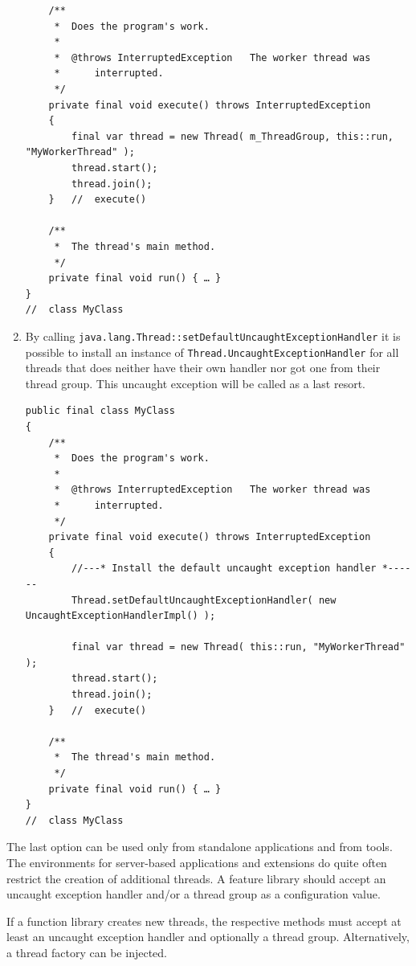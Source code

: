 \documentclass[11pt,a4paper, titlepage, parskip=half, headsepline, footsepline, cleardoublepage=current, headheight=1cm]{scrbook}
\begin{document}
\begin{enumerate}
{\begin{lstlisting}
    /**
     *  Does the program's work.
     *
     *  @throws InterruptedException   The worker thread was
     *      interrupted.
     */
    private final void execute() throws InterruptedException
    {
        final var thread = new Thread( m_ThreadGroup, this::run, "MyWorkerThread" );
        thread.start();
        thread.join();
    }   //  execute()
     
    /**
     *  The thread's main method.
     */
    private final void run() { … }
}
//  class MyClass
\end{lstlisting}
}
\item{By calling \lstinline|java.lang.Thread::setDefaultUncaughtExceptionHandler|\autocite{ORACLE_DOC_THREAD:setDefaultUncaughtExceptionHandler} it is possible to install an instance of \lstinline|Thread.UncaughtExceptionHandler| for all threads that does neither have their own handler nor got one from their thread group. This uncaught exception will be called as a last resort.
\begin{lstlisting}
public final class MyClass
{
    /**
     *  Does the program's work.
     *
     *  @throws InterruptedException   The worker thread was
     *      interrupted.
     */
    private final void execute() throws InterruptedException
    {
        //---* Install the default uncaught exception handler *------
        Thread.setDefaultUncaughtExceptionHandler( new UncaughtExceptionHandlerImpl() );
        
        final var thread = new Thread( this::run, "MyWorkerThread" );
        thread.start();
        thread.join();
    }   //  execute()
     
    /**
     *  The thread's main method.
     */
    private final void run() { … }
}
//  class MyClass
\end{lstlisting}
}
\end{enumerate}

The last option can be used only from standalone applications and from tools. The environments for server-based applications and extensions do quite often restrict the creation of additional threads. A feature library should accept an uncaught exception handler and/or a thread group as a configuration value.

If a function library creates new threads, the respective methods must accept at least an uncaught exception handler and optionally a thread group. Alternatively, a thread factory\autocite{ORACLE_DOC_THREADFACTORY_INTERFACE} can be injected.
 
\end{document}
